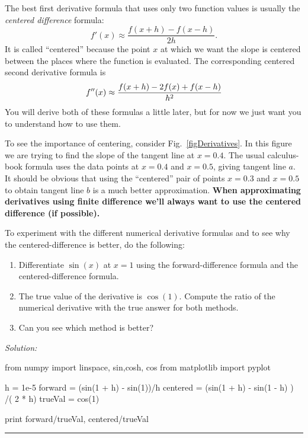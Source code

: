 The best first derivative formula that uses only two function values
is usually the {\it centered difference} formula: 
\begin{equation}\label{eq:CenteredDiff}
    f'(x) \approx \frac{f(x+h)-f(x-h)}{2h} .
\end{equation}
It is called ``centered'' because the point $x$ at which we want the
slope is centered between the places where the function is evaluated.
The corresponding centered second derivative formula is 
\begin{equation}\label{eq:seconderivative}
    f''(x) \approx {f(x+h)-2 f(x)+f(x-h) \over h^2}
\end{equation}
You will derive both of these formulas a little later, but for now we
just want you to understand how to use them.


  To see the importance of centering, consider
  Fig.~\ref{figDerivatives}. In this figure we are trying to find the
  slope of the tangent line at $x=0.4$.  The usual calculus-book
  formula uses the data points at $x=0.4$ and $x=0.5$, giving tangent
  line $a$. It should be obvious that using the ``centered'' pair of
  points $x=0.3$ and $x=0.5$ to obtain tangent line $b$ is a much
  better approximation. \textbf{When approximating derivatives using
  finite difference we'll always want to use the centered difference
  (if possible).}

\begin{enumerate}
\probtwo  To experiment with the different numerical derivative
formulas and to see why the centered-difference is better, do the
following:
\begin{enumerate}
\item Differentiate $\sin(x)$ at $x=1$ using the forward-difference
  formula and the centered-difference formula.
\item The true value of the derivative is $\cos(1)$.  Compute the
  ratio of the numerical derivative with the true answer for both
  methods.
\item Can you see which method is better?
\end{enumerate}
\end{enumerate}
\ifsolutions
\textit{Solution:}\\
\begin{codeexample}
\begin{VerbatimOut}{\listingFile}
from numpy import linspace, sin,cosh, cos
from matplotlib import pyplot

h = 1e-5
forward = (sin(1 + h) - sin(1))/h
centered = (sin(1 + h) - sin(1 - h) ) /( 2 * h)
trueVal = cos(1)

print forward/trueVal, centered/trueVal
\end{VerbatimOut}
\end{codeexample}
\else
\noindent\rule{5 in}{0.01 in}
\fi

